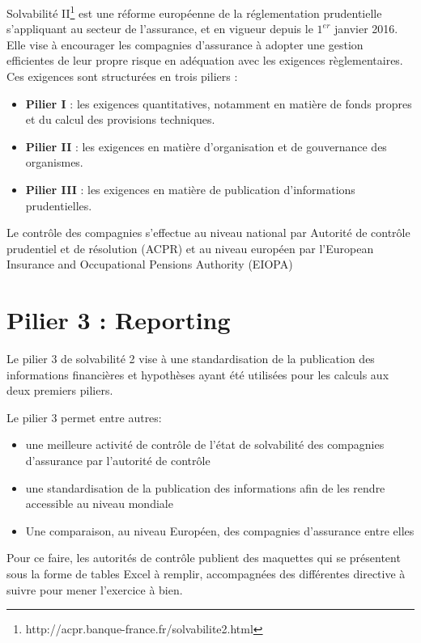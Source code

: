 Solvabilité II\footnote{http://acpr.banque-france.fr/solvabilite2.html} est une réforme européenne de la réglementation prudentielle s’appliquant au secteur de l'assurance, et en vigueur depuis le $1^{er}$ janvier 2016.
Elle vise à encourager les compagnies d'assurance à adopter une gestion efficientes de leur propre risque en adéquation avec les exigences règlementaires.
Ces exigences sont structurées en trois piliers : 
\begin{itemize}
\item \textbf{Pilier I} : les exigences quantitatives, notamment en matière de fonds propres et du calcul des provisions techniques.
\item \textbf{Pilier II} : les exigences en matière d’organisation et de gouvernance des organismes.
\item \textbf{Pilier III} : les exigences en matière de publication d'informations prudentielles. 
\end{itemize} 

 Le contrôle des compagnies s'effectue au niveau national par Autorité de contrôle prudentiel et de résolution (ACPR) et au niveau européen par 
 l'European Insurance and Occupational Pensions Authority (EIOPA)
 
\section{Pilier 3 : Reporting}

Le pilier 3 de solvabilité 2 vise à une standardisation de la publication des informations financières et hypothèses ayant été utilisées pour les calculs aux deux premiers piliers.

Le pilier 3 permet entre autres:

\begin{itemize}
\item une meilleure activité de contrôle de l'état de solvabilité des compagnies d'assurance par l'autorité de contrôle
\item une standardisation de la publication des informations afin de les rendre accessible au niveau mondiale
\item Une comparaison, au niveau Européen, des compagnies d'assurance entre elles
\end{itemize}

Pour ce faire, les autorités de contrôle publient des maquettes qui se présentent sous la forme de tables Excel à remplir, accompagnées des différentes directive à suivre pour mener l’exercice à bien.

